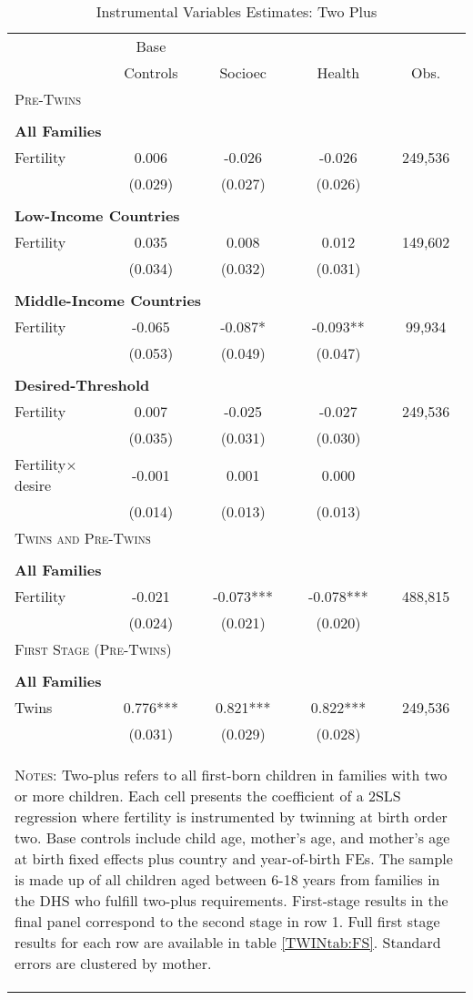 \begin{table}[!htbp] \centering 
\caption{Instrumental Variables Estimates: Two Plus} 
\label{TWINtab:IVTwoplus} 
\begin{tabular}{lcccc} \toprule \toprule 
&Base&&&\\
&Controls&Socioec&Health&Obs.\\\midrule
\multicolumn{5}{l}{\textsc{Pre-Twins}}\\ 
&&&&\\
\multicolumn{5}{l}{\textbf{All Families}}\\ 
Fertility&0.006&-0.026&-0.026&249,536\\
         &(0.029)&(0.027)&(0.026)&\\
&&&&\\
\multicolumn{5}{l}{\textbf{Low-Income Countries}}\\ 
Fertility&0.035&0.008&0.012&149,602\\
         &(0.034)&(0.032)&(0.031)&\\
&&&&\\
\multicolumn{5}{l}{\textbf{Middle-Income Countries}}\\ 
Fertility&-0.065&-0.087*&-0.093**&99,934\\
         &(0.053)&(0.049)&(0.047)&\\
&&&&\\
\multicolumn{5}{l}{\textbf{Desired-Threshold}}\\ 
Fertility&0.007&-0.025&-0.027&249,536\\
         &(0.035)&(0.031)&(0.030)&\\
Fertility$\times$desire&-0.001&0.001&0.000&\\
         &(0.014)&(0.013)&(0.013)&\\
\midrule\multicolumn{5}{l}{\textsc{Twins and Pre-Twins}}\\ 
&&&&\\
\multicolumn{5}{l}{\textbf{All Families}}\\ 
Fertility&-0.021&-0.073***&-0.078***&488,815\\
         &(0.024)&(0.021)&(0.020)&\\
\midrule\multicolumn{5}{l}{\textsc{First Stage (Pre-Twins)}}\\ 
&&&&\\
\multicolumn{5}{l}{\textbf{All Families}}\\ 
Twins&0.776***&0.821***&0.822***&249,536\\
         &(0.031)&(0.029)&(0.028)&\\
\hline\multicolumn{5}{p{10.0cm}}{\begin{footnotesize}\textsc{Notes:} Two-plus refers to all first-born children in families with two or more children.  Each cell presents the coefficient of a 2SLS regression where fertility is instrumented by twinning at birth order two.  Base controls include child age, mother's age, and mother's age at birth fixed effects plus country and year-of-birth FEs.  The sample is made up of all children aged between 6-18 years from families in the DHS who fulfill two-plus requirements. First-stage results in the final panel correspond to the second stage in row 1.  Full first stage results for each row are available in table \ref{TWINtab:FS}. Standard errors are clustered by mother. 

\end{footnotesize}}
\end{tabular}
\end{table}
